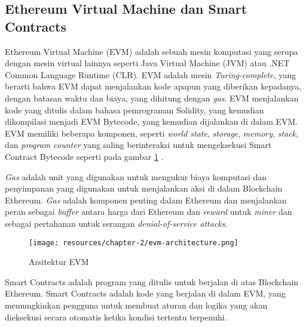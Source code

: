 \subsection{Ethereum Virtual Machine dan Smart Contracts}
\label{subsec:evm-smart-contract}

Ethereum Virtual Machine (EVM) adalah sebuah mesin komputasi yang serupa dengan mesin virtual lainnya seperti Java Virtual Machine (JVM) atau .NET Common Language Runtime (CLR). EVM adalah mesin \textit{Turing-complete}, yang berarti bahwa EVM dapat menjalankan kode apapun yang diberikan kepadanya, dengan batasan waktu dan biaya, yang dihitung dengan \textit{gas}. EVM menjalankan kode yang ditulis dalam bahasa pemrograman Solidity, yang kemudian dikompilasi menjadi EVM Bytecode, yang kemudian dijalankan di dalam EVM. EVM memiliki beberapa komponen, seperti \textit{world state}, \textit{storage}, \textit{memory}, \textit{stack}, dan \textit{program counter} yang saling berinteraksi untuk mengeksekusi Smart Contract Bytecode seperti pada gambar \ref{image:evm-architecture} \parencite{wood2014ethereum}.

\textit{Gas} adalah unit yang digunakan untuk mengukur biaya komputasi dan penyimpanan yang digunakan untuk menjalankan aksi di dalam Blockchain Ethereum. \textit{Gas} adalah komponen penting dalam Ethereum dan menjalankan peran sebagai \textit{buffer} antara harga dari Ethereum dan \textit{reward} untuk \textit{miner} dan sebagai pertahanan untuk serangan \textit{denial-of-service attacks}.

\begin{figure}[ht]
	\centering
	\texttt{[image: resources/chapter-2/evm-architecture.png]}
	\caption{Arsitektur EVM \parencite{antonopoulos2018mastering}}
	\label{image:evm-architecture}
\end{figure}

Smart Contracts adalah program yang ditulis untuk berjalan di atas Blockchain Ethereum. Smart Contracts adalah kode yang berjalan di dalam EVM, yang memungkinkan pengguna untuk membuat aturan dan logika yang akan dieksekusi secara otomatis ketika kondisi tertentu terpenuhi. 

